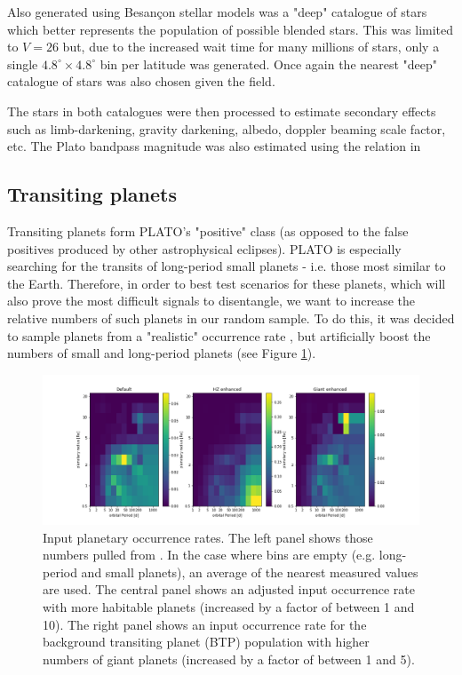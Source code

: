 \documentclass{article}
\begin{document}
Also generated using Besan\c{c}on stellar models was a "deep" catalogue of stars which better represents the population of possible blended stars.
This was limited to $V=26$ but, due to the increased wait time for many millions of stars, only a single $4.8^\circ\times4.8^\circ$ bin per latitude was generated. Once again the nearest "deep" catalogue of stars was also chosen given the field.

The stars in both catalogues were then processed to estimate secondary effects such as limb-darkening, gravity darkening, albedo, doppler beaming scale factor, etc. The Plato bandpass magnitude was also estimated using the relation in \citep{marchiori2019flight}


\subsection{Transiting planets}
Transiting planets form PLATO's "positive" class (as opposed to the false positives produced by other astrophysical eclipses). 
PLATO is especially searching for the transits of long-period small planets - i.e. those most similar to the Earth. 
Therefore, in order to best test scenarios for these planets, which will also prove the most difficult signals to disentangle, we want to increase the relative numbers of such planets in our random sample.
To do this, it was decided to sample planets from a "realistic" occurrence rate \citep[those from][]{petigura2018california}, but artificially boost the numbers of small and long-period planets (see Figure \ref{fig:occ_rates}).

\begin{figure}
    \centering
    \includegraphics[width=\textwidth]{petigura_old_new2.png}
    \caption{Input planetary occurrence rates. The left panel shows those numbers pulled from \citet{petigura2018california}. In the case where bins are empty (e.g. long-period and small planets), an average of the nearest measured values are used.
    The central panel shows an adjusted input occurrence rate with more habitable planets (increased by a factor of between 1 and 10). The right panel shows an input occurrence rate for the background transiting planet (BTP) population with higher numbers of giant planets (increased by a factor of between 1 and 5).}
    \label{fig:occ_rates}
\end{figure}
\end{document}
